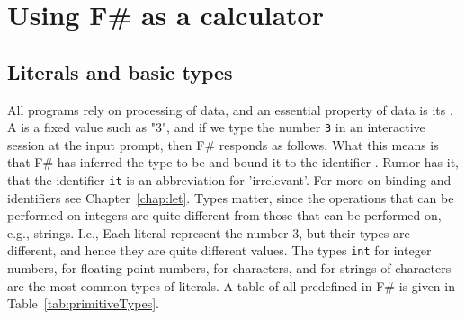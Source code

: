 \chapter{Using F\# as a calculator}
\label{chap:calculator}
\section{Literals and basic types}
All programs rely on processing of data, and an essential property of data is its . A  is a fixed value such as "3", and if we type the number \lstinline!3! in an interactive session at the input prompt, then F\# responds as follows,
%
%
What this means is that F\# has inferred the type to be  and bound it to the identifier . Rumor has it, that the identifier \lstinline|it| is an abbreviation for 'irrelevant'. For more on binding and identifiers see Chapter~\ref{chap:let}. Types matter, since the operations that can be performed on integers are quite different from those that can be performed on, e.g., strings. I.e.,
%
%
Each literal represent the number 3, but their types are different, and hence they are quite different values. The types \lstinline!int! for integer numbers,  for floating point numbers,  for characters, and  for strings of characters are the most common types of literals. A table of all  predefined in F\# is given in Table~\ref{tab:primitiveTypes}.
